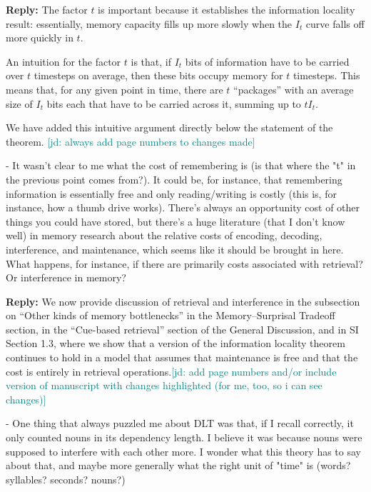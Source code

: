 \documentclass{article}[11pt,a4paper,oneside]
\newcommand\jd[1]{\textcolor{teal}{[jd: #1]}}
\newenvironment{reply}
  {\par\medskip
   \color{blue}%
   \begin{framed}
   \textbf{Reply: }\ignorespaces}
 {\end{framed}
  \medskip}
\begin{document}
\begin{reply}
The factor $t$ is important because it establishes the information locality result: essentially, memory capacity fills up more slowly when the $I_t$ curve falls off more quickly in $t$.

An intuition for the factor $t$ is that, if $I_t$ bits of information have to be carried over $t$ timesteps on average, then these bits occupy memory for $t$ timesteps.
This means that, for any given point in time, there are $t$ ``packages'' with an average size of $I_t$ bits each that have to be carried across it, summing up to $t I_t$.

We have added this intuitive argument directly below the statement of the theorem. \jd{always add page numbers to changes made}
\end{reply}

- It wasn't clear to me what the cost of remembering is (is that where the "t" in the previous point comes from?). It could be, for instance, that remembering information is essentially free and only reading/writing is costly (this is, for instance, how a thumb drive works). There's always an opportunity cost of other things you could have stored, but there's a huge literature (that I don't know well) in memory research about the relative costs of encoding, decoding, interference, and maintenance, which seems like it should be brought in here. What happens, for instance, if there are primarily costs associated with retrieval? Or interference in memory?

\begin{reply}
We now provide discussion of retrieval and interference in the subsection on ``Other kinds of memory bottlenecks'' in the Memory--Surprisal Tradeoff section, in the ``Cue-based retrieval'' section of the General Discussion, and in SI Section 1.3, where we show that a version of the information locality theorem continues to hold in a model that assumes that maintenance is free and that the cost is entirely in retrieval operations.\jd{add page numbers and/or include version of manuscript with changes highlighted (for me, too, so i can see changes)}
\end{reply}

- One thing that always puzzled me about DLT was that, if I recall correctly, it only counted nouns in its dependency length. I believe it was because nouns were supposed to interfere with each other more. I wonder what this theory has to say about that, and maybe more generally what the right unit of "time" is (words? syllables? seconds? nouns?)
\end{document}
